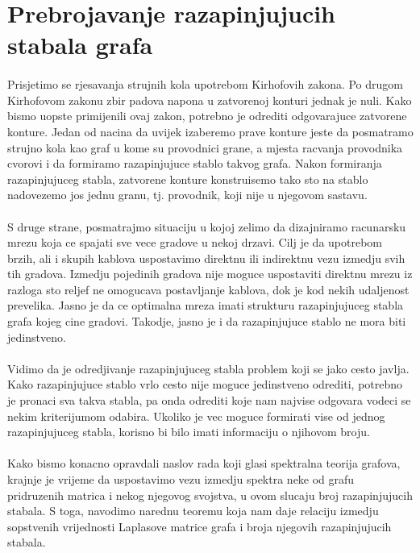 \documentclass[11pt]{article}
\begin{document}
	\section{Prebrojavanje razapinjujucih stabala grafa}
	
		\paragraph{}
		Prisjetimo se rjesavanja strujnih kola upotrebom Kirhofovih zakona. Po drugom Kirhofovom zakonu zbir padova napona u zatvorenoj konturi jednak je nuli. Kako bismo uopste primijenili ovaj zakon, 
		potrebno je odrediti odgovarajuce zatvorene konture. Jedan od nacina da uvijek izaberemo prave konture jeste da posmatramo strujno kola kao graf u kome su provodnici grane, 
		a mjesta racvanja provodnika cvorovi i da formiramo razapinjujuce stablo takvog grafa. Nakon formiranja razapinjujuceg stabla, zatvorene konture konstruisemo tako sto na stablo nadovezemo jos jednu granu,
	        tj. provodnik, koji nije u njegovom sastavu.
	
		\paragraph{}
	        S druge strane, posmatrajmo situaciju u kojoj zelimo da dizajniramo racunarsku mrezu koja ce spajati sve vece gradove u nekoj drzavi. 
		Cilj je da upotrebom brzih, ali i skupih kablova uspostavimo direktnu ili indirektnu vezu izmedju svih tih gradova.
		Izmedju pojedinih gradova nije moguce uspostaviti direktnu mrezu iz razloga sto reljef ne omogucava postavljanje kablova, dok je kod nekih udaljenost prevelika. Jasno je da ce optimalna mreza imati strukturu
		razapinjujuceg stabla grafa kojeg cine gradovi. Takodje, jasno je i da razapinjujuce stablo ne mora biti jedinstveno.
	
		\paragraph{}
		Vidimo da je odredjivanje razapinjujuceg stabla problem koji se jako cesto javlja. Kako razapinjujuce stablo vrlo cesto nije moguce jedinstveno odrediti, 
		potrebno je pronaci sva takva stabla, pa onda odrediti koje nam najvise odgovara vodeci se nekim kriterijumom odabira.  Ukoliko je vec moguce formirati vise od jednog razapinjujuceg stabla, 
		korisno bi bilo imati informaciju o njihovom broju.
		
		\paragraph{}
		Kako bismo konacno opravdali naslov rada koji glasi spektralna teorija grafova, krajnje je vrijeme da uspostavimo vezu izmedju spektra neke od grafu pridruzenih 	     
		matrica i nekog njegovog svojstva, u ovom slucaju broj razapinjujucih stabala. 
		S toga, navodimo narednu teoremu koja nam daje relaciju izmedju sopstvenih vrijednosti Laplasove matrice grafa i broja njegovih razapinjujucih stabala.
	
\end{document}
